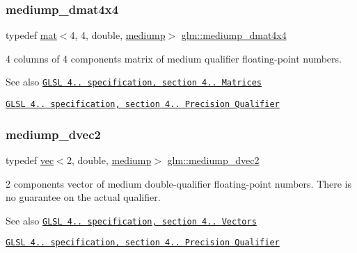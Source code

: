 \subsubsection{\texorpdfstring{mediump\+\_\+dmat4x4}{mediump\_dmat4x4}}
{\footnotesize\ttfamily typedef \hyperlink{structglm_1_1mat}{mat}$<$4, 4, double, \hyperlink{namespaceglm_a36ed105b07c7746804d7fdc7cc90ff25a6416f3ea0c9025fb21ed50c4d6620482}{mediump}$>$ \hyperlink{group__core__precision_ga53d2b544e1cf6812ed3b2f152d16a770}{glm\+::mediump\+\_\+dmat4x4}}

4 columns of 4 components matrix of medium qualifier floating-\/point numbers.

\begin{DoxySeeAlso}{See also}
\href{http://www.opengl.org/registry/doc/GLSLangSpec.4.20.8.pdf}{\tt G\+L\+SL 4.. specification, section 4.. Matrices} 

\href{http://www.opengl.org/registry/doc/GLSLangSpec.4.20.8.pdf}{\tt G\+L\+SL 4.. specification, section 4.. Precision Qualifier} 
\end{DoxySeeAlso}
\mbox{\label{group__core__precision_ga71307e1aa231cbc5d9de712a92714496}} 
\subsubsection{\texorpdfstring{mediump\+\_\+dvec2}{mediump\_dvec2}}
{\footnotesize\ttfamily typedef \hyperlink{structglm_1_1vec}{vec}$<$2, double, \hyperlink{namespaceglm_a36ed105b07c7746804d7fdc7cc90ff25a6416f3ea0c9025fb21ed50c4d6620482}{mediump}$>$ \hyperlink{group__core__precision_ga71307e1aa231cbc5d9de712a92714496}{glm\+::mediump\+\_\+dvec2}}

2 components vector of medium double-\/qualifier floating-\/point numbers. There is no guarantee on the actual qualifier.

\begin{DoxySeeAlso}{See also}
\href{http://www.opengl.org/registry/doc/GLSLangSpec.4.20.8.pdf}{\tt G\+L\+SL 4.. specification, section 4.. Vectors} 

\href{http://www.opengl.org/registry/doc/GLSLangSpec.4.20.8.pdf}{\tt G\+L\+SL 4.. specification, section 4.. Precision Qualifier} 
\end{DoxySeeAlso}
\mbox{\label{group__core__precision_ga11d5fecb18f3d7e5f7add0663a8d7d3f}} 
